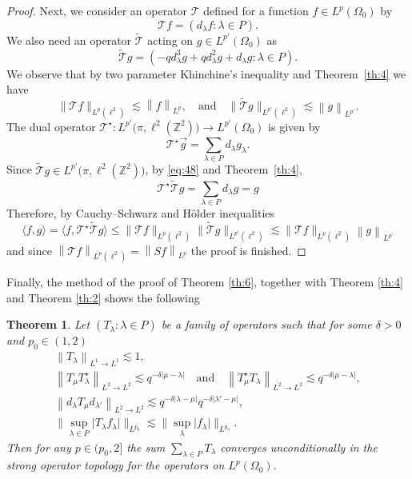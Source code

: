 \documentclass[a4paper]{amsart}
\newcommand{\sprod}[2]{{\langle #1, #2\rangle}}
\newcommand{\norm}[1]{{\left\lVert #1 \right\rVert}}
\newcommand{\abs}[1]{{\lvert {#1} \rvert}}
\newcommand{\pnorm}[2]{{\norm{{#1}}_{L^{#2} \rightarrow L^{#2}}}}
\newcommand{\seq}[2]{\left({#1}: {#2}\right)}
\newcommand{\ZZ}{\mathbb{Z}}
\theoremstyle{plain}
\newtheorem{theorem}{Theorem}
\theoremstyle{definition}
\theoremstyle{remark}
\numberwithin{equation}{section}
\theoremstyle{plain}
\begin{document}
\begin{proof}
	Next, we consider an operator $\mathcal{T}$ defined for a function $f \in L^p(\Omega_0)$ by
	$$
	\mathcal{T} f = \seq{d_\lambda f}{\lambda \in P}.
	$$
	We also need an operator $\widetilde{\mathcal{T}}$ acting on $g \in L^{p'}(\Omega_0)$ as
	$$
	\widetilde{\mathcal{T}}g 
	= \seq{-q d_\lambda^3 g + q d_\lambda^2 g + d_\lambda g}{\lambda \in P}.
	$$
	We observe that by two parameter Khinchine's inequality and Theorem~\ref{th:4} we have
	$$
	\big\lVert
	\mathcal{T} f 
	\big\rVert_{L^p(\ell^2)} \lesssim \norm{f}_{L^p}, \quad \text{and}\quad
	\big\lVert
	\widetilde{\mathcal{T}} g
	\big\rVert_{L^{p'}(\ell^2)} \lesssim \norm{g}_{L^{p'}}.
	$$
	The dual operator
	$\mathcal{T}^\star: L^{p'}\big(\pi, \ell^2(\ZZ^2)\big) \rightarrow L^{p'}(\Omega_0)$
	is given by
	$$
	\mathcal{T}^\star \vec{g} = \sum_{\lambda \in P} d_\lambda g_\lambda.
	$$
	Since $\widetilde{\mathcal{T}} g \in L^{p'}\big(\pi, \ell^2(\ZZ^2)\big)$,
	by \eqref{eq:48} and Theorem~\ref{th:4},
	$$
	\mathcal{T}^\star \widetilde{\mathcal{T}} g = \sum_{\lambda \in P} d_\lambda g = g
	$$
	Therefore, by Cauchy--Schwarz and H\"older inequalities
	$$
	\sprod{f}{g} = \sprod{f}{\mathcal{T}^\star \widetilde{\mathcal{T}} g}
	\leq
	\big\lVert
	\mathcal{T} f
	\big\rVert_{L^p(\ell^2)}
	\big\lVert
	\widetilde{\mathcal{T}} g
	\big\rVert_{L^{p'}(\ell^2)}
	\lesssim
	\big\lVert
	\mathcal{T} f
	\big\rVert_{L^p(\ell^2)}
	\norm{g}_{L^{p'}}
	$$
	and since $\norm{\mathcal{T}f}_{L^p(\ell^2)} = \norm{S f}_{L^p}$ the proof is finished.
\end{proof}

Finally, the method of the proof of Theorem \ref{th:6}, together with Theorem \ref{th:4} and Theorem \ref{th:2}
shows the following
\begin{theorem}
	Let $\seq{T_\lambda}{\lambda \in P}$ be a family of operators such that for some
	$\delta > 0$ and $p_0 \in (1, 2)$
	\begin{gather*}
		\pnorm{T_\lambda}{1} \lesssim 1, \\
		\pnorm{T_\mu T_\lambda^\star}{2} \lesssim q^{-\delta \abs{\mu-\lambda}} 
		\quad \text{and} 
		\quad \pnorm{T_\mu^\star T_\lambda}{2} \lesssim q^{-\delta \abs{\mu-\lambda}},\\
		\pnorm{d_\lambda T_\mu d_{\lambda'}}{2} 
		\lesssim q^{-\delta \abs{\lambda-\mu}} q^{-\delta \abs{\lambda'-\mu}},\\
		\big\lVert{\sup_{\lambda \in P} \abs{T_\lambda f_\lambda}}\big\rVert_{L^{p_0}} 
		\lesssim 
		\big\lVert \sup_\lambda \abs{f_\lambda} \big\rVert_{L^{p_0}}.
	\end{gather*}
	Then for any $p \in (p_0, 2]$ the sum $\sum_{\lambda \in P} T_\lambda$ converges
	unconditionally in the strong operator topology for the operators on $L^p(\Omega_0)$.
\end{theorem}
\end{document}

